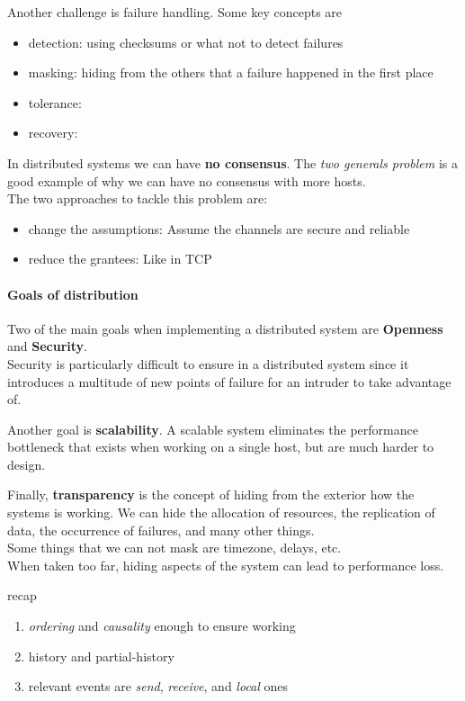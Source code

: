 \documentclass{article}
\begin{document}
Another challenge is failure handling. Some key concepts are
\begin{itemize}
    \item detection: using checksums or what not to detect failures
    \item masking: hiding from the others that a failure happened in the first place
    \item tolerance:
    \item recovery: 
\end{itemize}

In distributed systems we can have \textbf{no consensus}. The \textit{two generals problem} is a good example of why we can have no consensus with more hosts.\\
The two approaches to tackle this problem are:
\begin{itemize}
    \item change the assumptions: Assume the channels are secure and reliable
    \item reduce the grantees: Like in TCP
\end{itemize}

\paragraph{Goals of distribution}
Two of the main goals when implementing a distributed system are \textbf{Openness} and \textbf{Security}.\\
Security is particularly difficult to ensure in a distributed system since it introduces a multitude of new points of failure for an intruder to take advantage of.

Another goal is \textbf{scalability}. A scalable system eliminates the performance bottleneck that exists when working on a single host, but are much harder to design.

Finally, \textbf{transparency} is the concept of hiding from the exterior how the systems is working. We can hide the allocation of resources, the replication of data, the occurrence of failures, and many other things.\\
Some things that we can not mask are timezone, delays, etc.\\
When taken too far, hiding aspects of the system can lead to performance loss.

\begin{esempio}{recap}
    \begin{enumerate}
        \item \textit{ordering} and \textit{causality} enough to ensure working
        \item history and partial-history
        \item relevant events are \textit{send}, \textit{receive}, and \textit{local} ones
    \end{enumerate}
\end{esempio}
\end{document}
